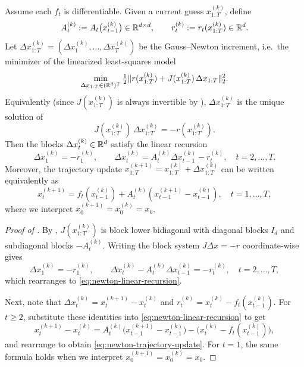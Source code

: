 \documentclass[11pt]{article}
\begin{document}
\begin{theorem}
\label{thm:newton-trajectory-step}
Assume each $f_t$ is differentiable.
Given a current guess $x_{1:T}^{(k)}$, define
\[
A_t^{(k)} := A_t\bigl(x_{t-1}^{(k)}\bigr) \in \mathbb{R}^{d\times d},
\qquad
r_t^{(k)} := r_t(x_{1:T}^{(k)}) \in \mathbb{R}^d.
\]
Let $\Delta x_{1:T}^{(k)}=(\Delta x_1^{(k)},\dots,\Delta x_T^{(k)})$ be the Gauss--Newton increment, i.e.\ the minimizer of the linearized least-squares model
\[
  \min_{\Delta x_{1:T}\in(\mathbb{R}^d)^T} \tfrac12 \lVert r(x_{1:T}^{(k)}) + J(x_{1:T}^{(k)})\,\Delta x_{1:T}\rVert_2^2.
\]
Equivalently (since $J(x_{1:T}^{(k)})$ is always invertible by ), $\Delta x_{1:T}^{(k)}$ is the unique solution of
\[
J(x_{1:T}^{(k)}) \, \Delta x_{1:T}^{(k)} = -r(x_{1:T}^{(k)}).
\]
Then the blocks $\Delta x_t^{(k)} \in \mathbb{R}^d$ satisfy the linear recursion
\begin{equation}
  \Delta x_1^{(k)} = -r_1^{(k)},
  \qquad
  \Delta x_t^{(k)} = A_t^{(k)} \Delta x_{t-1}^{(k)} - r_t^{(k)}, \quad t=2,\dots,T.
  \label{eq:newton-linear-recursion}
\end{equation}
Moreover, the trajectory update $x_{1:T}^{(k+1)} = x_{1:T}^{(k)} + \Delta x_{1:T}^{(k)}$ can be written equivalently as
\begin{equation}
  x_t^{(k+1)} = f_t\!\left(x_{t-1}^{(k)}\right) + A_t^{(k)} \left(x_{t-1}^{(k+1)} - x_{t-1}^{(k)}\right),
  \quad t=1,\dots,T,
  \label{eq:newton-trajectory-update}
\end{equation}
where we interpret $x_0^{(k+1)}=x_0^{(k)}=x_0$.
\end{theorem}

\begin{proof}[Proof of ]
By , $J(x_{1:T}^{(k)})$ is block lower bidiagonal with diagonal blocks $I_d$ and subdiagonal blocks $-A_t^{(k)}$.
Writing the block system $J\Delta x=-r$ coordinate-wise gives
\[
\Delta x_1^{(k)}=-r_1^{(k)},\qquad
\Delta x_t^{(k)}-A_t^{(k)}\Delta x_{t-1}^{(k)}=-r_t^{(k)},\quad t=2,\dots,T,
\]
which rearranges to \eqref{eq:newton-linear-recursion}.

Next, note that $\Delta x_t^{(k)}=x_t^{(k+1)}-x_t^{(k)}$ and $r_t^{(k)}=x_t^{(k)}-f_t(x_{t-1}^{(k)})$.
For $t\ge 2$, substitute these identities into \eqref{eq:newton-linear-recursion} to get
\[
x_t^{(k+1)}-x_t^{(k)}=A_t^{(k)}\bigl(x_{t-1}^{(k+1)}-x_{t-1}^{(k)}\bigr)-\bigl(x_t^{(k)}-f_t(x_{t-1}^{(k)})\bigr),
\]
and rearrange to obtain \eqref{eq:newton-trajectory-update}.
For $t=1$, the same formula holds when we interpret $x_0^{(k+1)}=x_0^{(k)}=x_0$.%
\end{proof}
\end{document}
